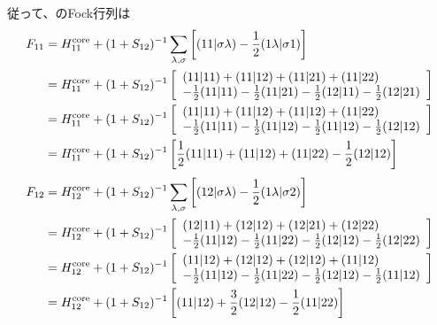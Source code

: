 従って、のFock行列は
\begin{align}
	F_{11}
&=
	H^{\rm core}_{11}
	+
	(1+S_{12})^{-1}
	\sum_{\lambda,\sigma}
		\left[
			\spacetwo{11}{\sigma\lambda}
			-
			\frac{1}{2}
			\spacetwo{1\lambda}{\sigma 1}
		\right] \\
%
%
&=
	H^{\rm core}_{11}
	+
	(1+S_{12})^{-1}
	\left[
	\begin{array}{l}
		\spacetwo{11}{11}
		+
		\spacetwo{11}{12}
		+
		\spacetwo{11}{21}
		+
		\spacetwo{11}{22} \\
		-
		\frac{1}{2}
		\spacetwo{11}{11}
		-
		\frac{1}{2}
		\spacetwo{11}{21}
		-
		\frac{1}{2}
		\spacetwo{12}{11}
		-
		\frac{1}{2}
		\spacetwo{12}{21}
	\end{array}
	\right] \\
%
%
&=
	H^{\rm core}_{11}
	+
	(1+S_{12})^{-1}
	\left[
	\begin{array}{l}
		\spacetwo{11}{11}
		+
		\spacetwo{11}{12}
		+
		\spacetwo{11}{12}
		+
		\spacetwo{11}{22} \\
		-
		\frac{1}{2}
		\spacetwo{11}{11}
		-
		\frac{1}{2}
		\spacetwo{11}{12}
		-
		\frac{1}{2}
		\spacetwo{11}{12}
		-
		\frac{1}{2}
		\spacetwo{12}{12}
	\end{array}
	\right] \\
%
%
&=
	H^{\rm core}_{11}
	+
	(1+S_{12})^{-1}
	\left[
		\frac{1}{2}
		\spacetwo{11}{11}
		+
		\spacetwo{11}{12}
		+
		\spacetwo{11}{22}
		-
		\frac{1}{2}
		\spacetwo{12}{12}
	\right]
\end{align}
\begin{align}
	F_{12}
&=
	H^{\rm core}_{12}
	+
	(1+S_{12})^{-1}
	\sum_{\lambda,\sigma}
		\left[
			\spacetwo{12}{\sigma\lambda}
			-
			\frac{1}{2}
			\spacetwo{1\lambda}{\sigma 2}
		\right] \\
%
%
&=
	H^{\rm core}_{12}
	+
	(1+S_{12})^{-1}
	\left[
	\begin{array}{l}
		\spacetwo{12}{11}
		+
		\spacetwo{12}{12}
		+
		\spacetwo{12}{21}
		+
		\spacetwo{12}{22} \\
		-
		\frac{1}{2}
		\spacetwo{11}{12}
		-
		\frac{1}{2}
		\spacetwo{11}{22}
		-
		\frac{1}{2}
		\spacetwo{12}{12}
		-
		\frac{1}{2}
		\spacetwo{12}{22}
	\end{array}
	\right] \\
%
%
&=
	H^{\rm core}_{12}
	+
	(1+S_{12})^{-1}
	\left[
	\begin{array}{l}
		\spacetwo{11}{12}
		+
		\spacetwo{12}{12}
		+
		\spacetwo{12}{12}
		+
		\spacetwo{11}{12} \\
		-
		\frac{1}{2}
		\spacetwo{11}{12}
		-
		\frac{1}{2}
		\spacetwo{11}{22}
		-
		\frac{1}{2}
		\spacetwo{12}{12}
		-
		\frac{1}{2}
		\spacetwo{11}{12}
	\end{array}
	\right] \\
%
%
&=
	H^{\rm core}_{12}
	+
	(1+S_{12})^{-1}
	\left[
		\spacetwo{11}{12}
		+
		\frac{3}{2}
		\spacetwo{12}{12}
		-
		\frac{1}{2}
		\spacetwo{11}{22}
	\right]
\end{align}
